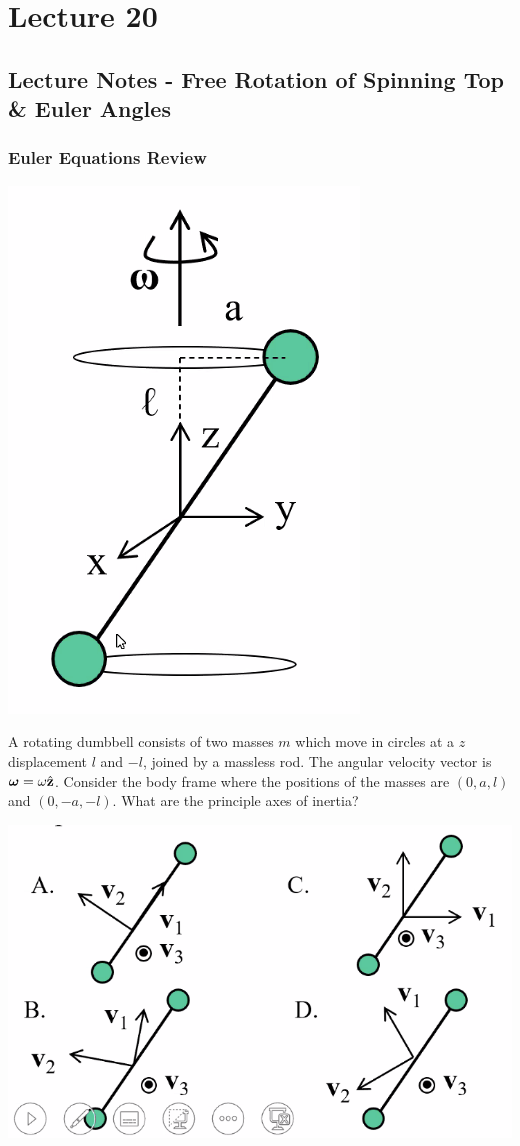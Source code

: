 \documentclass[../PHYS306Notes.tex]{subfiles}
\begin{document}
\section{Lecture 20}
\subsection{Lecture Notes - Free Rotation of Spinning Top \& Euler Angles}
\subsubsection{Euler Equations Review}
\begin{center}
    \includegraphics[scale=0.5]{Lecture-20/l20-img1.png}
\end{center}
A rotating dumbbell consists of two masses $m$ which move in circles at a $z$ displacement $l$ and $-l$, joined by a massless rod. The angular velocity vector is $\bm{\omega} = \omega\hat{\mathbf{z}}$. Consider the body frame where the positions of the masses are $(0, a, l)$ and $(0, -a, -l)$. What are the principle axes of inertia?
\begin{center}
    \includegraphics[scale=0.5]{Lecture-20/l20-img2.png}
\end{center}
\end{document}
